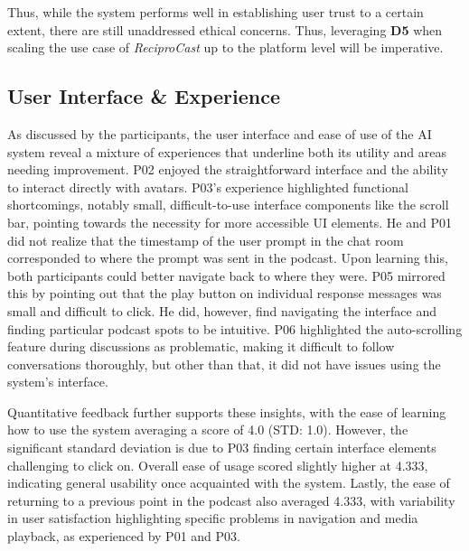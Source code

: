 \documentclass[12pt]{report}
\begin{document}
\begin{myfont}
        \indent Thus, while the system performs well in establishing user trust to a certain extent, there are still unaddressed ethical concerns. Thus, leveraging \textbf{D5} when scaling the use case of \textit{ReciproCast} up to the platform level will be imperative.
        
        \subsection{User Interface \& Experience}
        As discussed by the participants, the user interface and ease of use of the AI system reveal a mixture of experiences that underline both its utility and areas needing improvement. P02 enjoyed the straightforward interface and the ability to interact directly with avatars. P03's experience highlighted functional shortcomings, notably small, difficult-to-use interface components like the scroll bar, pointing towards the necessity for more accessible UI elements. He and P01 did not realize that the timestamp of the user prompt in the chat room corresponded to where the prompt was sent in the podcast. Upon learning this, both participants could better navigate back to where they were. P05 mirrored this by pointing out that the play button on individual response messages was small and difficult to click. He did, however, find navigating the interface and finding particular podcast spots to be intuitive. P06 highlighted the auto-scrolling feature during discussions as problematic, making it difficult to follow conversations thoroughly, but other than that, it did not have issues using the system's interface.
        
        \indent Quantitative feedback further supports these insights, with the ease of learning how to use the system averaging a score of 4.0 (STD: 1.0). However, the significant standard deviation is due to P03 finding certain interface elements challenging to click on. Overall ease of usage scored slightly higher at 4.333, indicating general usability once acquainted with the system. Lastly, the ease of returning to a previous point in the podcast also averaged 4.333, with variability in user satisfaction highlighting specific problems in navigation and media playback, as experienced by P01 and P03.


\end{myfont}
\end{document}
